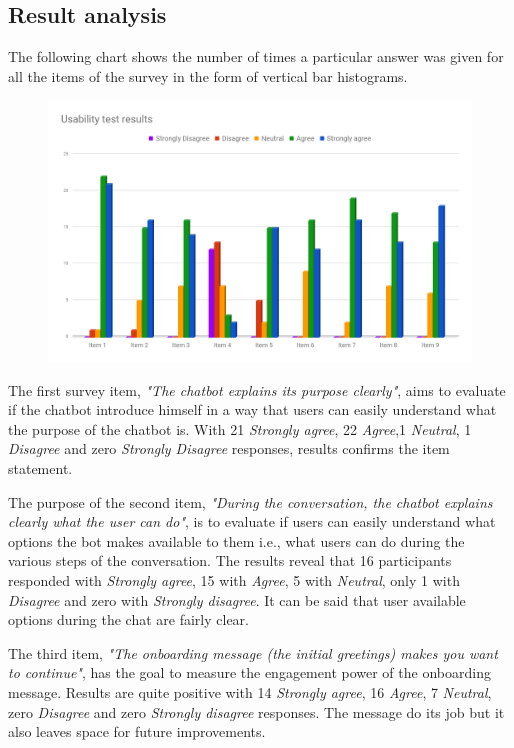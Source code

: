 \documentclass[b5paper,10pt,twoside,cucitura]{toptesi}
\begin{document}
\pagebreak

\subsection{Result analysis}

The following chart shows the number of times a particular answer was given for all the items of the survey in the form of vertical bar histograms.

\begin{figure}[ht]
\centering
\includegraphics[width=\textwidth]{chart_all.png}
\end{figure}

The first survey item, \textit{"The chatbot explains its purpose clearly"}, aims to evaluate if the chatbot introduce himself in a way that users can easily understand what the purpose of the chatbot is. With 21 \textit{Strongly agree}, 22 \textit{Agree},1 \textit{Neutral}, 1 \textit{Disagree} and zero \textit{Strongly Disagree} responses, results confirms the item statement.

The purpose of the second item, \textit{"During the conversation, the chatbot explains clearly what the user can do"}, is to evaluate if users can easily understand what options the bot makes available to them i.e., what users can do during the various steps of the conversation. The results reveal that 16 participants responded with \textit{Strongly agree}, 15 with \textit{Agree}, 5 with \textit{Neutral}, only 1 with \textit{Disagree} and zero with \textit{Strongly disagree}. It can be said that user available options during the chat are fairly clear.

The third item, \textit{"The onboarding message (the initial greetings) makes you want to continue"}, has the goal to measure the engagement power of the onboarding message. Results are quite positive with 14 \textit{Strongly agree}, 16 \textit{Agree}, 7 \textit{Neutral}, zero \textit{Disagree} and zero \textit{Strongly disagree} responses. The message do its job but it also leaves space for future improvements.
\end{document}
